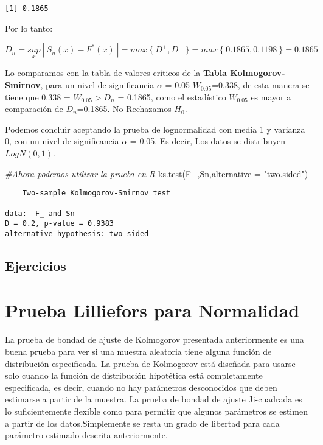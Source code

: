\documentclass[
  a4paper,
  oneside,
  openany]{book}
\newenvironment{Shaded}{\begin{snugshade}}{\end{snugshade}}
\newcommand{\AttributeTok}[1]{\textcolor[rgb]{0.77,0.63,0.00}{#1}}
\newcommand{\CommentTok}[1]{\textcolor[rgb]{0.56,0.35,0.01}{\textit{#1}}}
\newcommand{\FunctionTok}[1]{\textcolor[rgb]{0.00,0.00,0.00}{#1}}
\newcommand{\NormalTok}[1]{#1}
\newcommand{\StringTok}[1]{\textcolor[rgb]{0.31,0.60,0.02}{#1}}
\begin{document}
\begin{verbatim}
[1] 0.1865
\end{verbatim}

Por lo tanto:

\[D_{n}=\underset{x}{sup} \ | \ S_{n}(x)-F^*(x)\ |=max\ \{\ D^+,D^- \ \}=max \ \{ \ 0.1865,0.1198 \ \}=0.1865\]

Lo comparamos con la tabla de valores críticos de la \textbf{Tabla Kolmogorov-Smirnov}, para un nivel de significancia \(\alpha\) = 0.05
\(W_{0.05}\)=0.338, de esta manera se tiene que 0.338 = \(W_{0.05} > D_{n}\) = 0.1865, como el estadístico \(W_{0.05}\) es mayor a comparación de \(D_{n}\)=0.1865.
No Rechazamos \(H_0\).

Podemos concluir aceptando la prueba de lognormalidad con media 1 y varianza 0, con un nivel de significancia \(\alpha\) = 0.05. Es decir, Los datos se distribuyen \(LogN(0,1)\).

\begin{Shaded}
\begin{Highlighting}[]
\CommentTok{\#Ahora podemos utilizar la prueba en R}
\FunctionTok{ks.test}\NormalTok{(F\_,Sn,}\AttributeTok{alternative =} \StringTok{"two.sided"}\NormalTok{)}
\end{Highlighting}
\end{Shaded}

\begin{verbatim}
    Two-sample Kolmogorov-Smirnov test

data:  F_ and Sn
D = 0.2, p-value = 0.9383
alternative hypothesis: two-sided
\end{verbatim}

\hypertarget{ejercicios-13}{%
\section{Ejercicios}\label{ejercicios-13}}

\hypertarget{prueba-lilliefors-para-normalidad}{%
\chapter{Prueba Lilliefors para Normalidad}\label{prueba-lilliefors-para-normalidad}}

La prueba de bondad de ajuste de Kolmogorov presentada anteriormente es una buena prueba para ver si una muestra aleatoria tiene alguna función de distribución especificada. La prueba de Kolmogorov está diseñada para usarse solo cuando la función de distribución hipotética está completamente especificada, es decir, cuando no hay parámetros desconocidos que deben estimarse a partir de la muestra.
La prueba de bondad de ajuste Ji-cuadrada es lo suficientemente flexible como para permitir que algunos parámetros se estimen a partir de los datos.Simplemente se resta un grado de libertad para cada parámetro estimado descrita anteriormente.
\end{document}
